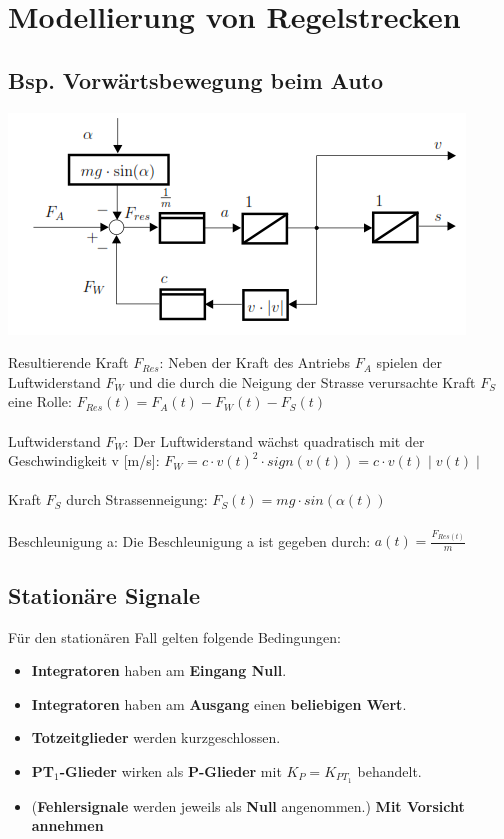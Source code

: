 \section{Modellierung von Regelstrecken}
\subsection{Bsp. Vorwärtsbewegung beim Auto }
\begin{minipage}[]{8cm}
\includegraphics[width=8 cm]{./bilder/auto.png}
\end{minipage}
\hspace{1cm}
\begin{minipage}[]{10cm}
Resultierende Kraft $F_{Res}$: Neben der Kraft des Antriebs $F_A$ spielen der Luftwiderstand $F_W$ und die durch die Neigung der Strasse verursachte Kraft $F_S$ eine Rolle: $F_{Res}(t) = F_A(t) - F_W(t) - F_S(t)$\\\\
Luftwiderstand $F_W$: Der Luftwiderstand wächst quadratisch mit der Geschwindigkeit v [m/s]: $F_W = c \cdot v(t)^2 \cdot  sign(v(t)) = c \cdot v(t)\mid v(t)\mid$\\\\
Kraft $F_S$ durch Strassenneigung: 
$F_S(t) = mg \cdot sin(\alpha(t))$\\\\
Beschleunigung a: Die Beschleunigung a ist gegeben durch: $a(t) = \frac{F_{Res(t)}}{m}$
\end{minipage}

\subsection{Stationäre Signale}
	Für den stationären Fall gelten folgende Bedingungen:
	\begin{itemize}
    	\item \textbf{Integratoren} haben am \textbf{Eingang Null}.
    	\item \textbf{Integratoren} haben am \textbf{Ausgang} einen \textbf{beliebigen Wert}.
    	\item \textbf{Totzeitglieder} werden kurzgeschlossen.
    	\item \textbf{PT$_1$-Glieder} wirken als \textbf{P-Glieder} mit $K_P = K_{PT_1}$ behandelt.
    	\item (\textbf{Fehlersignale} werden jeweils als \textbf{Null} angenommen.) \textbf{Mit Vorsicht annehmen}
  	\end{itemize}
  	\newpage